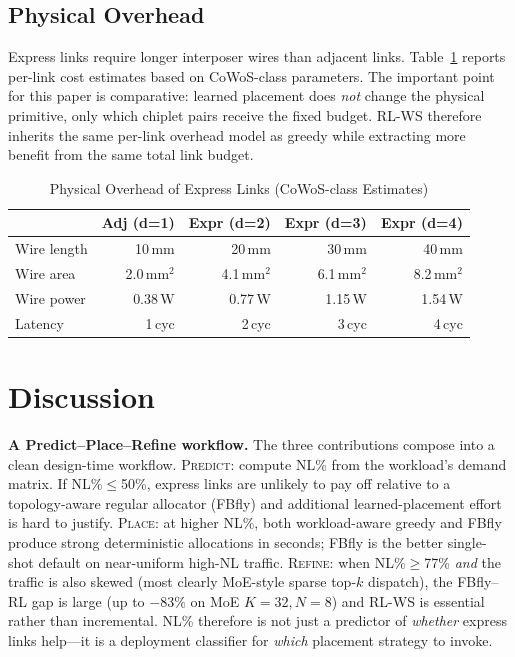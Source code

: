 \documentclass[conference]{IEEEtran}
\begin{document}
\subsection{Physical Overhead}

Express links require longer interposer wires than adjacent links. Table~\ref{tab:physical} reports per-link cost estimates based on CoWoS-class parameters. The important point for this paper is comparative: learned placement does \textit{not} change the physical primitive, only which chiplet pairs receive the fixed budget. RL-WS therefore inherits the same per-link overhead model as greedy while extracting more benefit from the same total link budget.

\begin{table}[t]
\centering
\caption{Physical Overhead of Express Links (CoWoS-class Estimates)}
\label{tab:physical}
\footnotesize
\begin{tabular}{lrrrr}
\toprule
& Adj (d=1) & Expr (d=2) & Expr (d=3) & Expr (d=4) \\
\midrule
Wire length & 10\,mm & 20\,mm & 30\,mm & 40\,mm \\
Wire area & 2.0\,mm$^2$ & 4.1\,mm$^2$ & 6.1\,mm$^2$ & 8.2\,mm$^2$ \\
Wire power & 0.38\,W & 0.77\,W & 1.15\,W & 1.54\,W \\
Latency & 1\,cyc & 2\,cyc & 3\,cyc & 4\,cyc \\
\bottomrule
\end{tabular}
\end{table}

\section{Discussion}

\textbf{A Predict--Place--Refine workflow.} The three contributions compose into a clean design-time workflow. \textsc{Predict}: compute NL\% from the workload's demand matrix. If NL\%$\le$50\%, express links are unlikely to pay off relative to a topology-aware regular allocator (FBfly) and additional learned-placement effort is hard to justify. \textsc{Place}: at higher NL\%, both workload-aware greedy and FBfly produce strong deterministic allocations in seconds; FBfly is the better single-shot default on near-uniform high-NL traffic. \textsc{Refine}: when NL\%$\ge$77\% \textit{and} the traffic is also skewed (most clearly MoE-style sparse top-$k$ dispatch), the FBfly--RL gap is large (up to $-83\%$ on MoE $K{=}32, N{=}8$) and RL-WS is essential rather than incremental. NL\% therefore is not just a predictor of \textit{whether} express links help---it is a deployment classifier for \textit{which} placement strategy to invoke.
\end{document}
